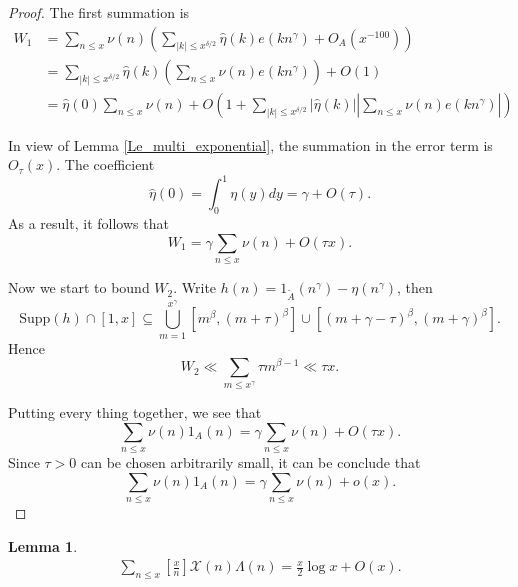 \documentclass[a4paper,10pt]{amsart}
\newtheorem{lemma}{Lemma}[section]
\newcommand{\X}{\mathcal X}
\begin{document}
\begin{proof}
The first summation is
\begin{align*}
W_1&=\sum_{n \leq x} \nu(n) \left(\sum_{|k|\leq x^{\delta/2}} 
\widehat{\eta}(k) e(kn^\gamma) + \textit{O}_A\left(x^{-100}\right) 
\right)\\
&= \sum_{|k|\leq x^{\delta/2}} \widehat{\eta}(k) 
\left(\sum_{n \leq x} \nu(n) e(kn^\gamma)\right) 
+\textit{O}\left(1\right)\\
& = \widehat{\eta}(0) \sum_{n \leq x} \nu(n) 
+\textit{O}\left(1+\sum_{|k|\leq x^{\delta/2}}|\widehat{\eta}(k)| 
\left|\sum_{n \leq x} \nu(n) e(kn^\gamma)\right|\right)
\end{align*}

In view of Lemma \cref{Le_multi_exponential}, 
the summation in the error term is $\textit{O}_\tau(x)$. The coefficient
\[
\widehat{\eta}(0)=\int_0^1 \eta(y) dy = \gamma + \textit{O}(\tau).
\]
As a result, it follows that
\[
W_1 = \gamma \sum_{n\leq x}\nu(n)+ \textit{O}\left(\tau x\right).
\]

Now we start to bound $W_2$. 
Write $h(n)=1_{\tilde{A}}(n^\gamma)-\eta(n^\gamma)$, then
\[
\text{Supp}(h)\cap [1,x] \subseteq \bigcup_{m=1}^{x^\gamma} 
[m^\beta, (m+\tau)^\beta] \cup [(m+\gamma-\tau)^\beta, (m+\gamma)^\beta].
\]
Hence
\[
W_2 \ll \sum_{m\leq x^\gamma} \tau m^{\beta-1} \ll \tau x.
\]

Putting every thing together, we see that
\[
\sum_{ n\leq x} \nu(n) 1_A(n) =\gamma \sum_{n\leq x}\nu(n)
+ \textit{O}\left( \tau x\right).
\]
Since $\tau>0$ can be chosen arbitrarily small, it can be conclude that
\[
\sum_{ n\leq x} \nu(n) 1_A(n) =\gamma \sum_{n\leq x}\nu(n)+\textit{o}(x).
\]
\end{proof}

\begin{lemma}
   \begin{align*}
       \sum_{n \leq x}\left[\frac{x}{n} \right]\X(n)\Lambda(n) 
       = \frac{x}{2}\log x + O(x). 
   \end{align*} 
\end{lemma}
\end{document}
